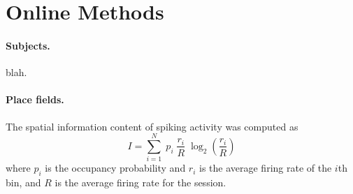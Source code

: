 
\section*{Online Methods}

\paragraph{Subjects.} 
blah.

\paragraph{Place fields.}
The spatial information content\cite{SkagMcNa93a} of spiking activity was computed as
\begin{equation}
  I=\sum_{i=1}^{N} \; p_i \; \frac{r_i}{R} \; \log_2\left(\frac{r_i}{R}\right)
  \label{eq:skaggs}
\end{equation}
where $p_i$ is the occupancy probability and $r_i$ is the average firing rate of the $i$th bin, and $R$ is the average
firing rate for the session.

